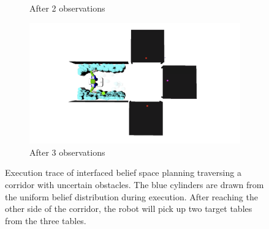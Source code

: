 \begin{figure}
\begin{subfigure}[b]{0.22\linewidth}
    \caption{After 2 observations}
    \label{fig:step3}
  \end{subfigure}
  \begin{subfigure}[b]{0.22\linewidth}
    \includegraphics[width=\textwidth]{corridor_images/3-observe.png}
    \caption{After 3 observations}
    \label{fig:step4}
  \end{subfigure}
  \caption{Execution trace of interfaced belief space planning
    traversing a corridor with uncertain obstacles.
    The blue cylinders are drawn from the uniform belief distribution
    during execution. After reaching the other side of the corridor,
    the robot will pick up two target tables from the three tables.}
  \label{fig:corridorimgs}
\end{figure}

